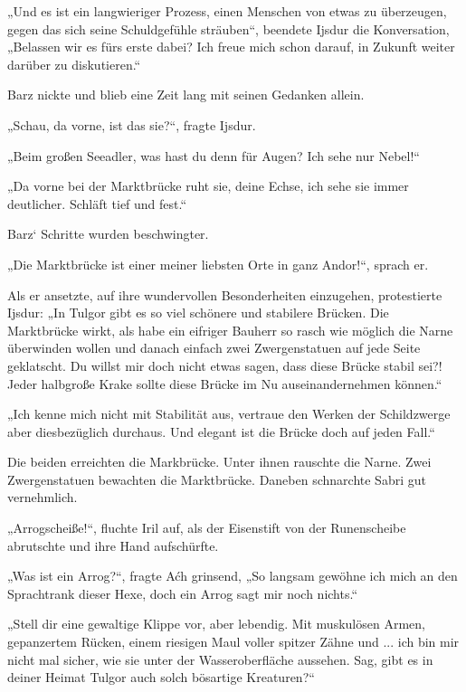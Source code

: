 „Und es ist ein langwieriger Prozess, einen Menschen von etwas zu überzeugen, gegen das sich seine Schuldgefühle sträuben“, beendete Ijsdur die Konversation, „Belassen wir es fürs erste dabei? Ich freue mich schon darauf, in Zukunft weiter darüber zu diskutieren.“

Barz nickte und blieb eine Zeit lang mit seinen Gedanken allein.

„Schau, da vorne, ist das sie?“, fragte Ijsdur.

„Beim großen Seeadler, was hast du denn für Augen? Ich sehe nur Nebel!“

„Da vorne bei der Marktbrücke ruht sie, deine Echse, ich sehe sie immer deutlicher. Schläft tief und fest.“

Barz‘ Schritte wurden beschwingter.

„Die Marktbrücke ist einer meiner liebsten Orte in ganz Andor!“, sprach er.

Als er ansetzte, auf ihre wundervollen Besonderheiten einzugehen, protestierte Ijsdur: „In Tulgor gibt es so viel schönere und stabilere Brücken. Die Marktbrücke wirkt, als habe ein eifriger Bauherr so rasch wie möglich die Narne überwinden wollen und danach einfach zwei Zwergenstatuen auf jede Seite geklatscht. Du willst mir doch nicht etwas sagen, dass diese Brücke stabil sei?! Jeder halbgroße Krake sollte diese Brücke im Nu auseinandernehmen können.“

„Ich kenne mich nicht mit Stabilität aus, vertraue den Werken der Schildzwerge aber diesbezüglich durchaus. Und elegant ist die Brücke doch auf jeden Fall.“

Die beiden erreichten die Markbrücke. Unter ihnen rauschte die Narne. Zwei Zwergenstatuen bewachten die Marktbrücke. Daneben schnarchte Sabri gut vernehmlich.\bigskip







„Arrogscheiße!“, fluchte Iril auf, als der Eisenstift von der Runenscheibe abrutschte und ihre Hand aufschürfte.

„Was ist ein Arrog?“, fragte Aćh grinsend, „So langsam gewöhne ich mich an den Sprachtrank dieser Hexe, doch ein Arrog sagt mir noch nichts.“

„Stell dir eine gewaltige Klippe vor, aber lebendig. Mit muskulösen Armen, gepanzertem Rücken, einem riesigen Maul voller spitzer Zähne und ... ich bin mir nicht mal sicher, wie sie unter der Wasseroberfläche aussehen. Sag, gibt es in deiner Heimat Tulgor auch solch bösartige Kreaturen?“

